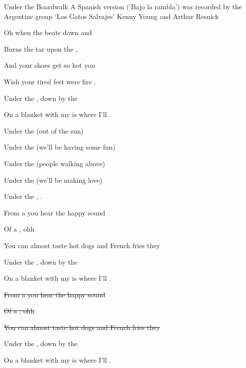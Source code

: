 \begin{SBSong}{Under the Boardwalk}
  {A Spanish version (`Bajo la rambla') was recorded by the Argentine group `Los Gatos Salvajes'}
  {Kenny Young and Arthur Resnick}
  \SBDirection{}
  \begin{SBVerse}
    Oh when the  beats down and
    
    Burns the tar upon the ,
    
    And your shoes get so hot you
    
    Wish your tired feet were fire . 
    
    Under the , down by the 
    
    On a blanket with my  is where I'll . 
  \end{SBVerse}
  \begin{SBChorus}
    Under the  (out of the sun)
    
    Under the  (we'll be having some fun)
    
    Under the  (people walking above)
    
    Under the  (we'll be making love)
    
    Under the , .
  \end{SBChorus}
  \begin{SBVerse}
    From a  you hear the happy sound
    
    Of a , ohh
    
    You can almost taste hot dogs and French fries they  
    
    Under the , down by the 
    
    On a blanket with my  is where I'll . 
  \end{SBVerse}
  \begin{SBVerse}
    \sout{From a  you hear the happy sound}
    
    \sout{Of a , ohh}
    
    \sout{You can almost taste hot dogs and French fries they  }
    
    Under the , down by the 
    
    On a blanket with my  is where I'll . 
  \end{SBVerse}
\end{SBSong}
